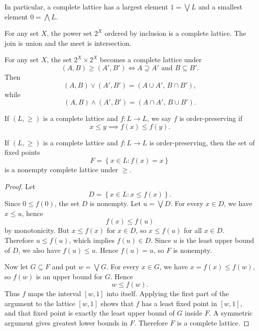 In particular, a complete lattice has a largest element $1 = \bigvee L$ and a smallest element $0 = \bigwedge L$.

\begin{example}
	For any set $X$, the power set $2^X$ ordered by inclusion is a complete lattice. The join is union and the meet is intersection.
\end{example}

\begin{example}
	For any set $X$, the set $2^X \times 2^X$ becomes a complete lattice under
	\[
		(A,B) \ge (A',B') \iff A \supseteq A' \text{ and } B \subseteq B'
	.\]
	Then
	\[
		(A,B) \vee (A',B') = \left(A \cup A',\, B \cap B'\right),
	\]
	while
	\[
		(A,B) \wedge (A',B') = \left(A \cap A',\, B \cup B'\right)
	.\]
\end{example}

\begin{definition}
	If $(L,\ge)$ is a complete lattice and $f : L \to L$, we say $f$ is order-preserving if
	\[
		x \le y \implies f(x) \le f(y)
	.\]
\end{definition}

\begin{theorem}[Tarski]
	If $(L,\ge)$ is a complete lattice and $f : L \to L$ is order-preserving, then the set of fixed points
	\[
		F = \left\{x \in L : f(x) = x\right\}
	\]
	is a nonempty complete lattice under $\ge$.
\end{theorem}
\begin{proof}
	Let
	\[
		D = \left\{x \in L : x \le f(x)\right\}
	.\]
	Since $0 \le f(0)$, the set $D$ is nonempty. Let $u = \bigvee D$. For every $x \in D$, we have $x \le u$, hence
	\[
		f(x) \le f(u)
	\]
	by monotonicity. But $x \le f(x)$ for $x \in D$, so $x \le f(u)$ for all $x \in D$. Therefore $u \le f(u)$, which implies $f(u) \in D$. Since $u$ is the least upper bound of $D$, we also have $f(u) \le u$. Hence $f(u)=u$, so $F$ is nonempty.

	Now let $G \subseteq F$ and put $w = \bigvee G$. For every $x \in G$, we have $x = f(x) \le f(w)$, so $f(w)$ is an upper bound for $G$. Hence
	\[
		w \le f(w)
	.\]
	Thus $f$ maps the interval $\left[w,1\right]$ into itself. Applying the first part of the argument to the lattice $\left[w,1\right]$ shows that $f$ has a least fixed point in $\left[w,1\right]$, and that fixed point is exactly the least upper bound of $G$ inside $F$. A symmetric argument gives greatest lower bounds in $F$. Therefore $F$ is a complete lattice.
\end{proof}
